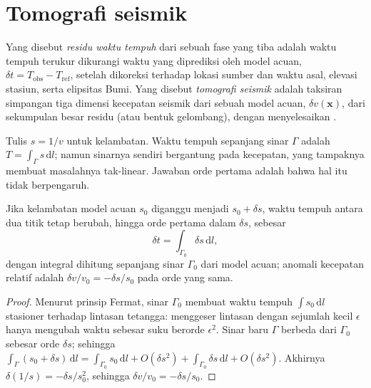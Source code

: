\section{Tomografi seismik}\label{sec:b3:seismology-imaging:tomography}

\begin{definition}\label{def:b3:seismology-imaging:tomography}
Yang disebut \emph{residu waktu tempuh} dari sebuah fase yang tiba adalah
waktu tempuh terukur dikurangi waktu yang diprediksi oleh model acuan,
$\delta t = T_{\text{obs}} - T_{\text{ref}}$, setelah dikoreksi terhadap lokasi
sumber dan waktu asal, elevasi stasiun, serta
elipsitas Bumi. Yang disebut \emph{tomografi seismik} adalah
taksiran simpangan tiga dimensi kecepatan seismik dari sebuah
model acuan, $\delta v(\mathbf x)$, dari sekumpulan besar residu (atau
bentuk gelombang), dengan menyelesaikan .
\end{definition}

Tulis $s = 1/v$ untuk kelambatan. Waktu tempuh sepanjang sinar $\Gamma$ adalah
$T = \int_\Gamma s\,\mathrm dl$; namun sinarnya sendiri bergantung pada kecepatan,
yang tampaknya membuat masalahnya tak-linear. Jawaban orde pertama adalah bahwa hal itu
tidak berpengaruh.

\begin{proposition}\label{prop:b3:seismology-imaging:linear}
Jika kelambatan model acuan $s_0$ diganggu menjadi $s_0 + \delta s$,
waktu tempuh antara dua titik tetap berubah, hingga orde pertama dalam
$\delta s$, sebesar
\[
  \delta t = \int_{\Gamma_0}\delta s\,\mathrm dl ,
\]
dengan integral dihitung sepanjang sinar $\Gamma_0$ dari model acuan; anomali
kecepatan relatif adalah $\delta v/v_0 = -\delta s/s_0$ pada orde yang sama.
\end{proposition}

\begin{proof}
Menurut prinsip Fermat, sinar $\Gamma_0$ membuat waktu tempuh
$\int s_0\,\mathrm dl$ stasioner terhadap lintasan tetangga: menggeser lintasan dengan
sejumlah kecil $\epsilon$ hanya mengubah waktu sebesar suku berorde $\epsilon^2$.
Sinar baru $\Gamma$ berbeda dari $\Gamma_0$ sebesar orde $\delta s$;
sehingga $\int_\Gamma(s_0 + \delta s)\,\mathrm dl = \int_{\Gamma_0}s_0\,\mathrm dl +
O(\delta s^2) + \int_{\Gamma_0}\delta s\,\mathrm dl + O(\delta s^2)$. Akhirnya
$\delta(1/s) = -\delta s/s_0^2$, sehingga $\delta v/v_0 = -\delta s/s_0$.
\end{proof}

